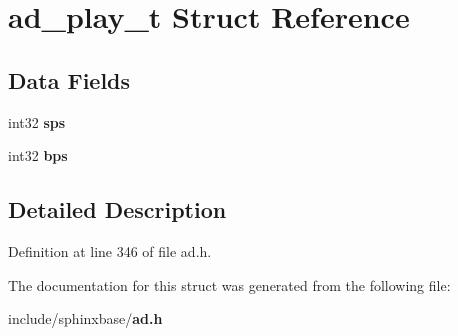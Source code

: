 \section{ad\-\_\-play\-\_\-t Struct Reference}
\label{structad__play__t}
\subsection*{Data Fields}
\begin{DoxyCompactItemize}
\item 
int32 {\bfseries sps}\label{structad__play__t_aa183d6146e18a876b8eb7a7b6f09bfc7}

\item 
int32 {\bfseries bps}\label{structad__play__t_afb37e59f996e4de0123af01f258ea0f1}

\end{DoxyCompactItemize}


\subsection{Detailed Description}


Definition at line 346 of file ad.\-h.



The documentation for this struct was generated from the following file\-:\begin{DoxyCompactItemize}
\item 
include/sphinxbase/{\bf ad.\-h}\end{DoxyCompactItemize}
